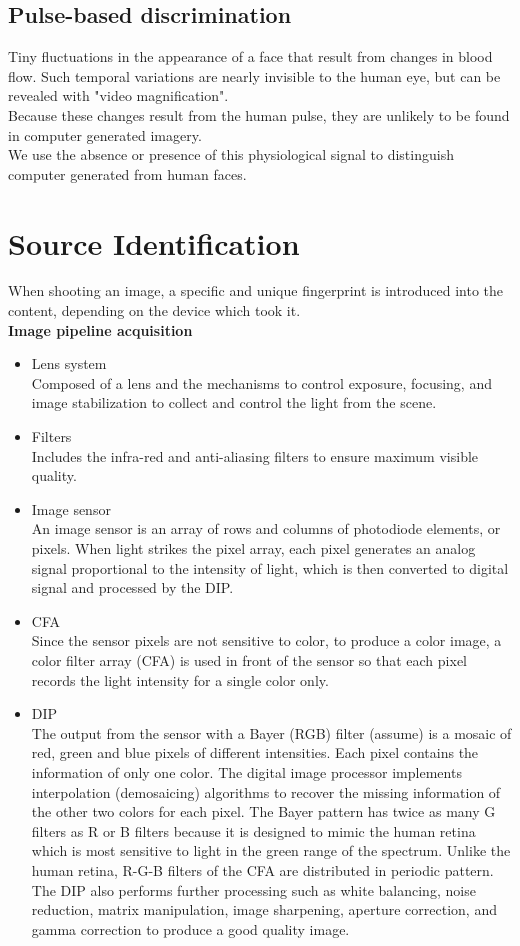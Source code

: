 \documentclass[10pt,a4paper]{book}
\begin{document}
\subsection{Pulse-based discrimination}
Tiny fluctuations in the appearance of a face that result from changes in blood flow. Such temporal variations are nearly invisible to the human eye,
but can be revealed with "video magnification".\\
Because these changes result from the human pulse, they are unlikely to be found in computer generated imagery.\\
We use the absence or presence of this physiological signal to distinguish computer generated from human faces.

\newpage
\section{Source Identification}
When shooting an image, a specific and unique fingerprint is introduced into the content, depending on the device which took it.\\
\textbf{Image pipeline acquisition}\\
\begin{itemize}
\item Lens system\\
Composed of a lens and the mechanisms to control exposure, focusing, and image stabilization to collect and control the light from the scene.
\item Filters\\
Includes the infra-red and anti-aliasing filters to ensure maximum visible quality.
\item Image sensor\\
An image sensor is an array of rows and columns of photodiode elements, or pixels. When light strikes the pixel array, each pixel generates an analog signal proportional to the intensity of light, which is then converted to digital signal and processed by the DIP.
\item CFA\\
Since the sensor pixels are not sensitive to color, to produce a color image, a color filter array (CFA) is used in front of the sensor so that each pixel records the light intensity for a single color only.
\item DIP\\
The output from the sensor with a Bayer (RGB) filter (assume) is a mosaic of red, green and blue pixels of different intensities. Each pixel contains the information of only one color. The digital image processor implements interpolation (demosaicing) algorithms to recover the missing information of the other two colors for each pixel. The Bayer pattern has twice as many G filters as R or B filters because it is designed to mimic the human retina which is most sensitive to light in the green range of the spectrum. Unlike the human retina, R-G-B filters of the CFA are distributed in periodic pattern. The DIP also performs further processing such as white balancing, noise reduction, matrix manipulation, image sharpening, aperture correction, and gamma correction to produce a good quality image.
\end{itemize}
\end{document}
